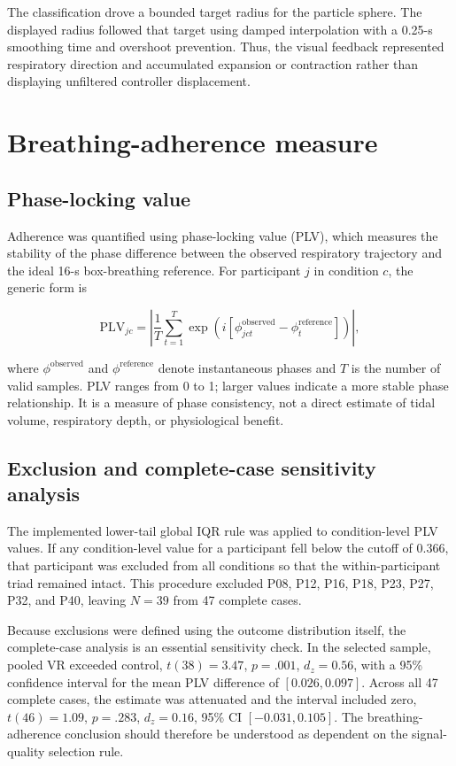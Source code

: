 \documentclass[pdflatex,sn-mathphys-num]{sn-jnl}
\begin{document}
The classification drove a bounded target radius for the particle sphere. The displayed radius followed that target using damped interpolation with a 0.25-s smoothing time and overshoot prevention. Thus, the visual feedback represented respiratory direction and accumulated expansion or contraction rather than displaying unfiltered controller displacement.

\section{Breathing-adherence measure}

\subsection{Phase-locking value}

Adherence was quantified using phase-locking value (PLV), which measures the stability of the phase difference between the observed respiratory trajectory and the ideal 16-s box-breathing reference. For participant $j$ in condition $c$, the generic form is

\begin{equation}
\mathrm{PLV}_{jc}=\left|\frac{1}{T}\sum_{t=1}^{T}\exp\left(i[\phi^{\mathrm{observed}}_{jct}-\phi^{\mathrm{reference}}_{t}]\right)\right|,
\end{equation}

where $\phi^{\mathrm{observed}}$ and $\phi^{\mathrm{reference}}$ denote instantaneous phases and $T$ is the number of valid samples. PLV ranges from 0 to 1; larger values indicate a more stable phase relationship. It is a measure of phase consistency, not a direct estimate of tidal volume, respiratory depth, or physiological benefit.

\subsection{Exclusion and complete-case sensitivity analysis}

The implemented lower-tail global IQR rule was applied to condition-level PLV values. If any condition-level value for a participant fell below the cutoff of 0.366, that participant was excluded from all conditions so that the within-participant triad remained intact. This procedure excluded P08, P12, P16, P18, P23, P27, P32, and P40, leaving $N=39$ from 47 complete cases.

Because exclusions were defined using the outcome distribution itself, the complete-case analysis is an essential sensitivity check. In the selected sample, pooled VR exceeded control, $t(38)=3.47$, $p=.001$, $d_z=0.56$, with a 95\% confidence interval for the mean PLV difference of $[0.026,0.097]$. Across all 47 complete cases, the estimate was attenuated and the interval included zero, $t(46)=1.09$, $p=.283$, $d_z=0.16$, 95\% CI $[-0.031,0.105]$. The breathing-adherence conclusion should therefore be understood as dependent on the signal-quality selection rule.
\end{document}
